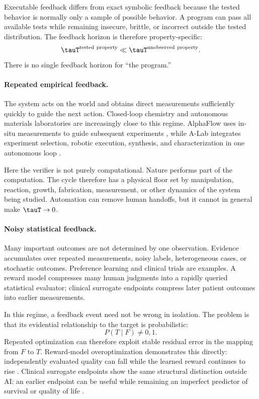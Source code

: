 Executable feedback differs from exact symbolic feedback because the tested behavior
is normally only a sample of possible behavior.  A program can pass all available
tests while remaining insecure, brittle, or incorrect outside the tested distribution.
The feedback horizon is therefore property-specific:
\[
    \tauT^{\mathrm{tested\ property}}
    \ll
    \tauT^{\mathrm{unobserved\ property}}.
\]
There is no single feedback horizon for ``the program.''

\paragraph{Repeated empirical feedback.}
The system acts on the world and obtains direct measurements sufficiently quickly to
guide the next action.  Closed-loop chemistry and autonomous materials laboratories
are increasingly close to this regime.  AlphaFlow uses in-situ measurements to guide
subsequent experiments \parencite{volk2023alphaflow}, while A-Lab integrates experiment
selection, robotic execution, synthesis, and characterization in one autonomous loop
\parencite{szymanski2023alab}.

Here the verifier is not purely computational.  Nature performs part of the
computation.  The cycle therefore has a physical floor set by manipulation, reaction,
growth, fabrication, measurement, or other dynamics of the system being studied.
Automation can remove human handoffs, but it cannot in general make
\(\tauT\rightarrow0\).

\paragraph{Noisy statistical feedback.}
Many important outcomes are not determined by one observation.  Evidence accumulates
over repeated measurements, noisy labels, heterogeneous cases, or stochastic outcomes.
Preference learning and clinical trials are examples.  A reward model compresses many
human judgments into a rapidly queried statistical evaluator; clinical surrogate
endpoints compress later patient outcomes into earlier measurements.

In this regime, a feedback event need not be wrong in isolation.  The problem is that
its evidential relationship to the target is probabilistic:
\[
    P(T\mid F) \neq 0,1.
\]
Repeated optimization can therefore exploit stable residual error in the mapping from
\(F\) to \(T\).  Reward-model overoptimization demonstrates this directly:
independently evaluated quality can fall while the learned reward continues to rise
\parencite{gao2022overoptimization,rafailov2024direct}.  Clinical surrogate endpoints show
the same structural distinction outside AI: an earlier endpoint can be useful while
remaining an imperfect predictor of survival or quality of life
\parencite{gyawali2019accelerated,naci2017accelerated,liu2024clinicalbenefit}.

